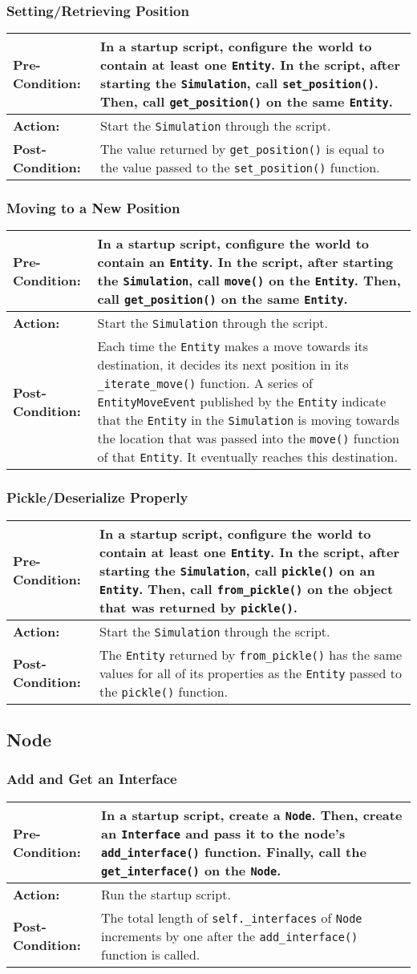 \documentclass[titlepage]{article}
\newcommand{\testcase}[3]{
    \begin{center}
    \begin{tabular}{| l | p{0.7\textwidth}|}
        \hline
        \rowcolor[gray]{0.8}\textbf{Pre-Condition:} & #1 \\ \hline
        \textbf{Action:} & #2 \\ \hline
        \rowcolor[gray]{0.8}\textbf{Post-Condition:} & #3 \\ \hline
    \end{tabular}
    \end{center}
}
\begin{document}
\subsubsection{Setting/Retrieving Position}
\testcase{In a startup script, configure the world to contain at least one \texttt{Entity}. In the script, after starting the \texttt{Simulation}, call \texttt{set\_position()}. Then, call \texttt{get\_position()} on the same \texttt{Entity}.}{Start the \texttt{Simulation} through the script.}{The value returned by \texttt{get\_position()} is equal to the value passed to the \texttt{set\_position()} function.}

\subsubsection{Moving to a New Position}
\testcase{In a startup script, configure the world to contain an \texttt{Entity}.  In the script, after starting the \texttt{Simulation}, call \texttt{move()} on the \texttt{Entity}. Then, call \texttt{get\_position()} on the same \texttt{Entity}.}{Start the \texttt{Simulation} through the script.}{Each time the \texttt{Entity} makes a move towards its destination, it decides its next position in its \texttt{\_iterate\_move()} function. A series of \texttt{EntityMoveEvent} published by the \texttt{Entity} indicate that the \texttt{Entity} in the \texttt{Simulation} is moving towards the location that was passed into the \texttt{move()} function of that \texttt{Entity}. It eventually reaches this destination.}

\subsubsection{Pickle/Deserialize Properly}
\testcase{In a startup script, configure the world to contain at least one \texttt{Entity}. In the script, after starting the \texttt{Simulation}, call \texttt{pickle()} on an \texttt{Entity}. Then, call \texttt{from\_pickle()} on the object that was returned by \texttt{pickle()}.}{Start the \texttt{Simulation} through the script.}{The \texttt{Entity} returned by \texttt{from\_pickle()} has the same values for all of its properties as the \texttt{Entity} passed to the \texttt{pickle()} function.}

\subsection{Node}
\subsubsection{Add and Get an Interface}
\testcase{In a startup script, create a \texttt{Node}. Then, create an \texttt{Interface} and pass it to the node's \texttt{add\_interface()} function. Finally, call the \texttt{get\_interface()} on the \texttt{Node}.}{Run the startup script.}{The total length of \texttt{self.\_interfaces} of \texttt{Node} increments by one after the \texttt{add\_interface()} function is called.}
\end{document}
